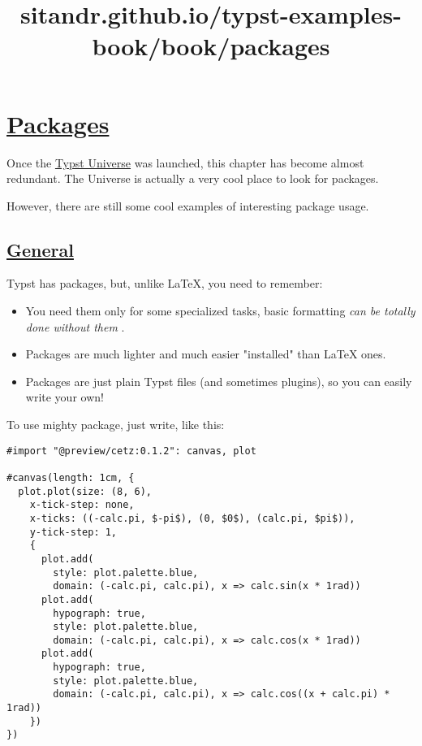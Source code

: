 \title{sitandr.github.io/typst-examples-book/book/packages}

\section{\texorpdfstring{\hyperref[packages]{Packages}}{Packages}}\label{packages}

Once the \href{https://typst.app/universe}{Typst Universe} was launched,
this chapter has become almost redundant. The Universe is actually a
very cool place to look for packages.

However, there are still some cool examples of interesting package
usage.

\subsection{\texorpdfstring{\hyperref[general]{General}}{General}}\label{general}

Typst has packages, but, unlike LaTeX, you need to remember:

\begin{itemize}
\tightlist
\item
  You need them only for some specialized tasks, basic formatting
  \emph{can be totally done without them} .
\item
  Packages are much lighter and much easier "installed" than LaTeX ones.
\item
  Packages are just plain Typst files (and sometimes plugins), so you
  can easily write your own!
\end{itemize}

To use mighty package, just write, like this:

\begin{verbatim}
#import "@preview/cetz:0.1.2": canvas, plot

#canvas(length: 1cm, {
  plot.plot(size: (8, 6),
    x-tick-step: none,
    x-ticks: ((-calc.pi, $-pi$), (0, $0$), (calc.pi, $pi$)),
    y-tick-step: 1,
    {
      plot.add(
        style: plot.palette.blue,
        domain: (-calc.pi, calc.pi), x => calc.sin(x * 1rad))
      plot.add(
        hypograph: true,
        style: plot.palette.blue,
        domain: (-calc.pi, calc.pi), x => calc.cos(x * 1rad))
      plot.add(
        hypograph: true,
        style: plot.palette.blue,
        domain: (-calc.pi, calc.pi), x => calc.cos((x + calc.pi) * 1rad))
    })
})
\end{verbatim}

\pandocbounded{}

